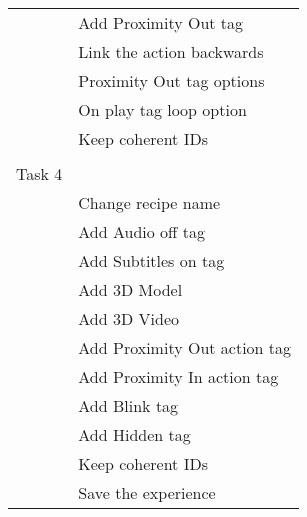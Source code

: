 \begin{longtable}{ll}
       & Add Proximity Out tag        \\
       & Link the action backwards    \\
       & Proximity Out tag options    \\
       & On play tag loop option      \\
       & Keep coherent IDs            \\
       &                              \\
Task 4 &                              \\ \hline
       & Change recipe name           \\
       & Add Audio off tag            \\
       & Add Subtitles on tag         \\
       & Add 3D Model                 \\
       & Add 3D Video                 \\
       & Add Proximity Out action tag \\
       & Add Proximity In action tag  \\
       & Add Blink tag                \\
       & Add Hidden tag               \\
       & Keep coherent IDs            \\
       & Save the experience         
\end{longtable}